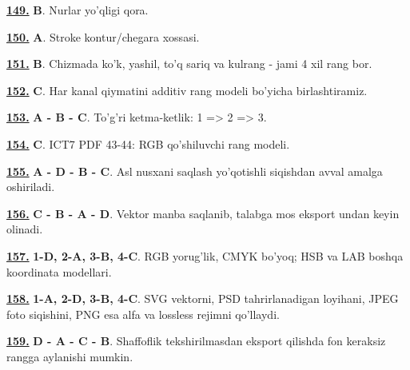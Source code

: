 \documentclass[10pt,a4paper,oneside]{article}
\begin{document}
\par\vspace{3mm}
\noindent\hyperlink{q149}{\textbf{149.}} \textbf{B}.  Nurlar yo'qligi qora.
\par\vspace{3mm}
\noindent\hyperlink{q150}{\textbf{150.}} \textbf{A}.  Stroke kontur/chegara xossasi.
\par\vspace{3mm}
\noindent\hyperlink{q151}{\textbf{151.}} \textbf{B}.  Chizmada ko'k, yashil, to'q sariq va kulrang - jami 4 xil rang bor.
\par\vspace{3mm}
\noindent\hyperlink{q152}{\textbf{152.}} \textbf{C}.  Har kanal qiymatini additiv rang modeli bo'yicha birlashtiramiz.
\par\vspace{3mm}
\noindent\hyperlink{q153}{\textbf{153.}} \textbf{A - B - C}.  To'g'ri ketma-ketlik: 1 =\textgreater{} 2 =\textgreater{} 3.
\par\vspace{3mm}
\noindent\hyperlink{q154}{\textbf{154.}} \textbf{C}.  ICT7 PDF 43-44: RGB qo'shiluvchi rang modeli.
\par\vspace{3mm}
\noindent\hyperlink{q155}{\textbf{155.}} \textbf{A - D - B - C}.  Asl nusxani saqlash yo'qotishli siqishdan avval amalga oshiriladi.
\par\vspace{3mm}
\noindent\hyperlink{q156}{\textbf{156.}} \textbf{C - B - A - D}.  Vektor manba saqlanib, talabga mos eksport undan keyin olinadi.
\par\vspace{3mm}
\noindent\hyperlink{q157}{\textbf{157.}} \textbf{1-D, 2-A, 3-B, 4-C}.  RGB yorug'lik, CMYK bo'yoq; HSB va LAB boshqa koordinata modellari.
\par\vspace{3mm}
\noindent\hyperlink{q158}{\textbf{158.}} \textbf{1-A, 2-D, 3-B, 4-C}.  SVG vektorni, PSD tahrirlanadigan loyihani, JPEG foto siqishini, PNG esa alfa va lossless rejimni qo'llaydi.
\par\vspace{3mm}
\noindent\hyperlink{q159}{\textbf{159.}} \textbf{D - A - C - B}.  Shaffoflik tekshirilmasdan eksport qilishda fon keraksiz rangga aylanishi mumkin.
\end{document}
